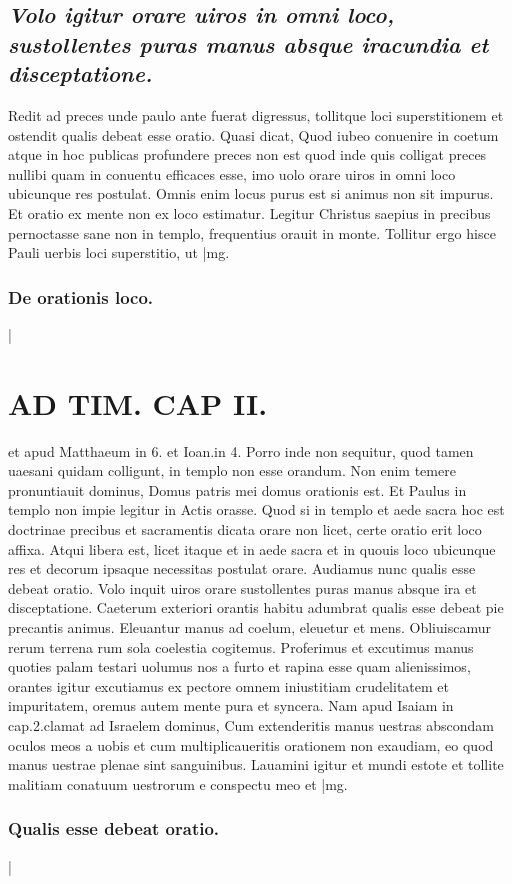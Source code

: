 \documentclass{article}
\begin{document}
\begin{pages}
\subsection*{\textit{Volo igitur orare uiros in omni loco, sustollentes puras manus absque iracundia et disceptatione. }}\pstart Redit ad preces unde paulo ante fuerat digressus, tollitque loci superstitionem et ostendit qualis debeat esse oratio. Quasi dicat, Quod iubeo conuenire in coetum atque in hoc publicas profundere preces non est quod inde quis colligat preces nullibi quam in conuentu efficaces esse, imo uolo orare uiros in omni loco ubicunque res postulat. Omnis enim locus purus est si animus non sit impurus. Et oratio ex mente non ex loco estimatur. Legitur Christus saepius in precibus pernoctasse sane non in templo, frequentius orauit in monte. Tollitur ergo hisce Pauli uerbis loci superstitio, ut  \pend
|mg. \subsubsection*{De orationis loco. }|
\section*{AD TIM. CAP II. }
\marginpar{[ p.118 ]}\pstart et apud Matthaeum in 6. et Ioan.in 4. Porro inde non sequitur, quod tamen uaesani quidam colligunt, in templo non esse orandum. Non enim temere pronuntiauit dominus, Domus patris mei domus orationis est. Et Paulus in templo non impie legitur in Actis orasse. Quod si in templo et aede sacra hoc est doctrinae precibus et sacramentis dicata orare non licet, certe oratio erit loco affixa. Atqui libera est, licet itaque et in aede sacra et in quouis loco ubicunque res et decorum ipsaque necessitas postulat orare. Audiamus nunc qualis esse debeat oratio. Volo inquit uiros orare sustollentes puras manus absque ira et disceptatione. Caeterum exteriori orantis habitu adumbrat qualis esse debeat pie precantis animus. Eleuantur manus ad coelum, eleuetur et mens. Obliuiscamur rerum terrena rum sola coelestia cogitemus. Proferimus et excutimus manus quoties palam testari uolumus nos a furto et rapina esse quam alienissimos, orantes igitur excutiamus ex pectore omnem iniustitiam crudelitatem et impuritatem, oremus autem mente pura et syncera. Nam apud Isaiam in cap.2.clamat ad Israelem dominus, Cum extenderitis manus uestras abscondam oculos meos a uobis et cum multiplicaueritis orationem non exaudiam, eo quod manus uestrae plenae sint sanguinibus. Lauamini igitur et mundi estote et tollite malitiam conatuum uestrorum e conspectu meo et  \pend
|mg. \subsubsection*{Qualis esse debeat oratio. }|

\end{pages}
\end{document}
